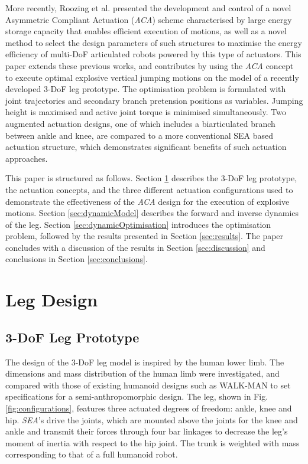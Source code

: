 \documentclass[letterpaper, 10 pt, conference]{ieeeconf}  %
\begin{document}
More recently, Roozing et al. \cite{roozing2016development, roozing2016design} presented the development and control of a novel Asymmetric Compliant Actuation (\textit{ACA}) scheme characterised by large energy storage capacity that enables efficient execution of motions, as well as a novel method to select the design parameters of such structures to maximise the energy efficiency of multi-DoF articulated robots powered by this type of actuators. This paper extends these previous works, and contributes by using the \textit{ACA} concept to execute optimal explosive vertical jumping motions on the model of a recently developed 3-DoF leg prototype. The optimisation problem is formulated with joint trajectories and secondary branch pretension positions as variables. Jumping height is maximised and active joint torque is minimised simultaneously. Two augmented actuation designs, one of which includes a biarticulated branch between ankle and knee, are compared to a more conventional SEA based actuation structure, which demonstrates significant benefits of such actuation approaches.

This paper is structured as follows. Section \ref{sec:legDesign} describes the 3-DoF leg prototype, the actuation concepts, and the three different actuation configurations used to demonstrate the effectiveness of the \textit{ACA} design for the execution of explosive motions. Section \ref{sec:dynamicModel} describes the forward and inverse dynamics of the leg. Section \ref{sec:dynamicOptimisation} introduces the optimisation problem, followed by the results presented in Section \ref{sec:results}. The paper concludes with a discussion of the results in Section \ref{sec:discussion} and conclusions in Section \ref{sec:conclusions}.


\section{Leg Design } \label{sec:legDesign}

\subsection{3-DoF Leg Prototype}

The design of the 3-DoF leg model is inspired by the human lower limb. The dimensions and mass distribution of the human limb were investigated, and compared with those of existing humanoid designs such as WALK-MAN \cite{tsagarakis2017walk} to set specifications for a semi-anthropomorphic design. The leg, shown in Fig. \ref{fig:configurations}, features three actuated degrees of freedom: ankle, knee and hip. \textit{SEA}'s drive the joints, which are mounted above the joints for the knee and ankle and transmit their forces through four bar linkages to decrease the leg’s moment of inertia with respect to the hip joint. The trunk is weighted with mass corresponding to that of a full humanoid robot.
\end{document}
